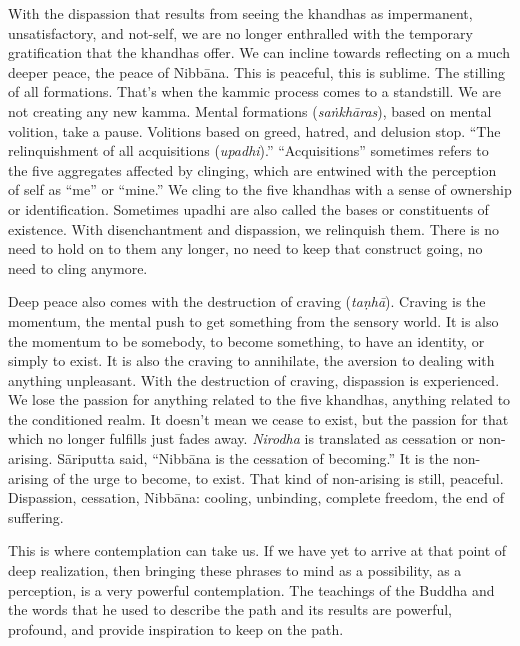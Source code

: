 With the dispassion that results from seeing the khandhas as impermanent, unsatisfactory, and not-self, we are no longer enthralled with the temporary \mbox{gratification} that the khandhas offer. We can incline towards reflecting on a much deeper peace, the peace of \mbox{Nibbāna.} This is peaceful, this is sublime. The stilling of all formations. That's when the kammic process comes to a standstill. We are not creating any new kamma. Mental formations (\emph{saṅkhāras}), based on mental volition, take a pause. Volitions based on greed, hatred, and delusion stop. ``The relinquishment of all acquisitions (\emph{upadhi}).'' ``Acquisitions'' sometimes refers to the five aggregates affected by clinging, which are entwined with the perception of self as ``me'' or ``mine.'' We cling to the five khandhas with a sense of ownership or identification. Sometimes upadhi are also called the bases or constituents of existence. With disenchantment and dispassion, we relinquish them. There is no need to hold on to them any longer, no need to keep that construct going, no need to cling anymore.

Deep peace also comes with the destruction of craving (\emph{taṇhā}). Craving is the momentum, the mental push to get something from the sensory world. It is also the momentum to be somebody, to become something, to have an identity, or simply to exist. It is also the craving to annihilate, the aversion to dealing with anything unpleasant. With the destruction of craving, dispassion is experienced. We lose the passion for anything related to the five khandhas, anything related to the conditioned realm. It doesn't mean we cease to exist, but the passion for that which no longer fulfills just fades away. \emph{Nirodha} is translated as cessation or non-arising. Sāriputta said, ``Nibbāna is the cessation of becoming.'' It is the non-arising of the urge to become, to exist. That kind of non-arising is still, peaceful. Dispassion, cessation, Nibbāna: cooling, unbinding, complete freedom, the end of suffering.

This is where contemplation can take us. If we have yet to arrive at that point of deep realization, then bringing these phrases to mind as a possibility, as a perception, is a very powerful contemplation. The teachings of the Buddha and the words that he used to describe the path and its results are powerful, profound, and provide inspiration to keep on the path.
